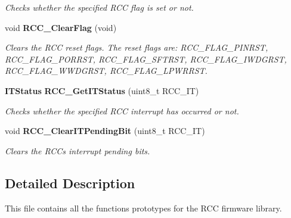 \begin{DoxyCompactItemize}
\begin{DoxyCompactList}\small\item\em Checks whether the specified R\+CC flag is set or not. \end{DoxyCompactList}\item 
void \textbf{ R\+C\+C\+\_\+\+Clear\+Flag} (void)
\begin{DoxyCompactList}\small\item\em Clears the R\+CC reset flags. The reset flags are\+: R\+C\+C\+\_\+\+F\+L\+A\+G\+\_\+\+P\+I\+N\+R\+ST, R\+C\+C\+\_\+\+F\+L\+A\+G\+\_\+\+P\+O\+R\+R\+ST, R\+C\+C\+\_\+\+F\+L\+A\+G\+\_\+\+S\+F\+T\+R\+ST, R\+C\+C\+\_\+\+F\+L\+A\+G\+\_\+\+I\+W\+D\+G\+R\+ST, R\+C\+C\+\_\+\+F\+L\+A\+G\+\_\+\+W\+W\+D\+G\+R\+ST, R\+C\+C\+\_\+\+F\+L\+A\+G\+\_\+\+L\+P\+W\+R\+R\+ST. \end{DoxyCompactList}\item 
\textbf{ I\+T\+Status} \textbf{ R\+C\+C\+\_\+\+Get\+I\+T\+Status} (uint8\+\_\+t R\+C\+C\+\_\+\+IT)
\begin{DoxyCompactList}\small\item\em Checks whether the specified R\+CC interrupt has occurred or not. \end{DoxyCompactList}\item 
void \textbf{ R\+C\+C\+\_\+\+Clear\+I\+T\+Pending\+Bit} (uint8\+\_\+t R\+C\+C\+\_\+\+IT)
\begin{DoxyCompactList}\small\item\em Clears the R\+CC\textquotesingle{}s interrupt pending bits. \end{DoxyCompactList}\end{DoxyCompactItemize}


\subsection{Detailed Description}
This file contains all the functions prototypes for the R\+CC firmware library. 

